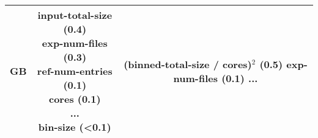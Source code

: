 \begin{table}[t]
\begin{tabular}{|c||c||c|}
    
   \\ \hline %
    
    \textbf{GB} 
    & \makecell{input-total-size (0.4) \\ exp-num-files (0.3) \\ ref-num-entries (0.1) \\ cores (0.1) \\ ... \\ \textbf{bin-size} (<0.1)} 
    & \makecell{ \textbf{(binned-total-size / cores)$^2$} (0.5) \\  exp-num-files (0.1) \\ ...} 
    
    \\ \hline

\end{tabular}


\end{table}